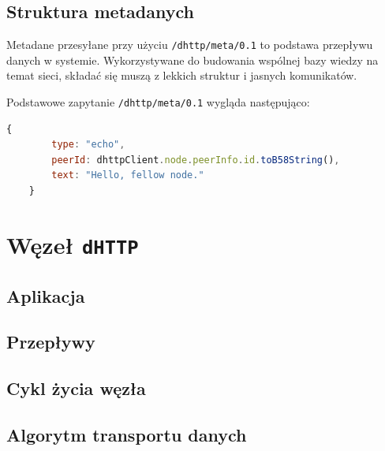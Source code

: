 \subsection{Struktura metadanych}

Metadane przesyłane przy użyciu \texttt{/dhttp/meta/0.1} to podstawa przepływu danych w systemie. Wykorzystywane do budowania wspólnej bazy wiedzy na temat sieci, składać się muszą z lekkich struktur i jasnych komunikatów.

Podstawowe zapytanie \texttt{/dhttp/meta/0.1} wygląda następująco:

\begin{lstlisting}[language=javascript]
    {
        type: "echo",
        peerId: dhttpClient.node.peerInfo.id.toB58String(),
        text: "Hello, fellow node."
    }
\end{lstlisting}







\section{Węzeł \texttt{dHTTP}}

\subsection{Aplikacja}

\subsection{Przepływy}
\label{sub:flows}

\subsection{Cykl życia węzła}
\label{sub:nodeCycle}

\subsection{Algorytm transportu danych}

